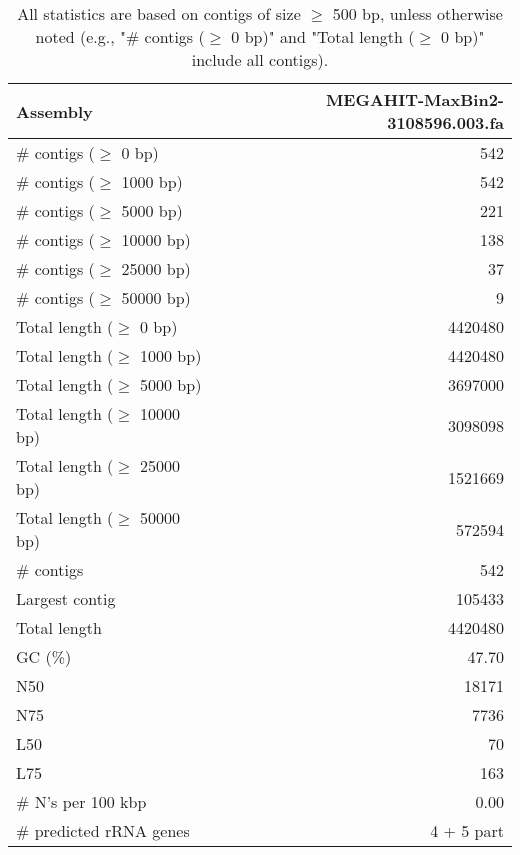 \documentclass[12pt,a4paper]{article}
\begin{document}
\begin{table}[ht]
\begin{center}
\caption{All statistics are based on contigs of size $\geq$ 500 bp, unless otherwise noted (e.g., "\# contigs ($\geq$ 0 bp)" and "Total length ($\geq$ 0 bp)" include all contigs).}
\begin{tabular}{|l*{1}{|r}|}
\hline
Assembly & MEGAHIT-MaxBin2-3108596.003.fa \\ \hline
\# contigs ($\geq$ 0 bp) & 542 \\ \hline
\# contigs ($\geq$ 1000 bp) & 542 \\ \hline
\# contigs ($\geq$ 5000 bp) & 221 \\ \hline
\# contigs ($\geq$ 10000 bp) & 138 \\ \hline
\# contigs ($\geq$ 25000 bp) & 37 \\ \hline
\# contigs ($\geq$ 50000 bp) & 9 \\ \hline
Total length ($\geq$ 0 bp) & 4420480 \\ \hline
Total length ($\geq$ 1000 bp) & 4420480 \\ \hline
Total length ($\geq$ 5000 bp) & 3697000 \\ \hline
Total length ($\geq$ 10000 bp) & 3098098 \\ \hline
Total length ($\geq$ 25000 bp) & 1521669 \\ \hline
Total length ($\geq$ 50000 bp) & 572594 \\ \hline
\# contigs & 542 \\ \hline
Largest contig & 105433 \\ \hline
Total length & 4420480 \\ \hline
GC (\%) & 47.70 \\ \hline
N50 & 18171 \\ \hline
N75 & 7736 \\ \hline
L50 & 70 \\ \hline
L75 & 163 \\ \hline
\# N's per 100 kbp & 0.00 \\ \hline
\# predicted rRNA genes & 4 + 5 part \\ \hline
\end{tabular}
\end{center}
\end{table}
\end{document}
